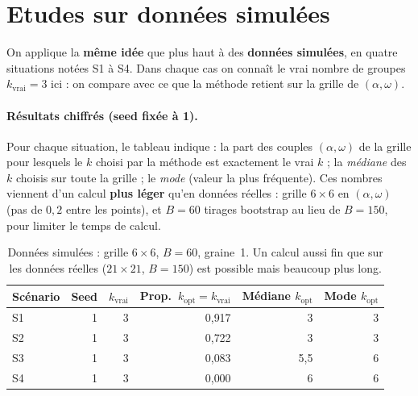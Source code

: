 \documentclass[11pt, a4paper]{article}
\begin{document}
\section{Etudes sur données simulées}

On applique la \textbf{même idée} que plus haut à des \textbf{données simulées},
en quatre situations notées S1 à S4. Dans chaque cas on connaît le vrai nombre de
groupes $k_{\mathrm{vrai}}=3$ ici : on compare avec ce que la méthode retient sur
la grille de $(\alpha,\omega)$.

\paragraph{Résultats chiffrés (seed fixée à 1).}
Pour chaque situation, le tableau indique : la part des couples
$(\alpha,\omega)$ de la grille pour lesquels le $k$ choisi par la méthode est
exactement le vrai $k$ ; la \emph{médiane} des $k$ choisis sur toute la grille ;
le \emph{mode} (valeur la plus fréquente). Ces nombres viennent d'un calcul
\textbf{plus léger} qu'en données réelles : grille $6\times6$ en $(\alpha,\omega)$
(pas de $0{,}2$ entre les points), et $B=60$ tirages bootstrap au lieu de
$B=150$, pour limiter le temps de calcul.

\begin{table}[H]
\centering
\small
\begin{tabular}{lrrrrr}
\toprule
\textbf{Scénario} & \textbf{Seed} & $k_{\mathrm{vrai}}$ &
\textbf{Prop.\ }$k_{\mathrm{opt}} = k_{\mathrm{vrai}}$ &
\textbf{Médiane} $k_{\mathrm{opt}}$ & \textbf{Mode} $k_{\mathrm{opt}}$ \\
\midrule
S1 & 1 & 3 & 0{,}917 & 3 & 3 \\
S2 & 1 & 3 & 0{,}722 & 3 & 3 \\
S3 & 1 & 3 & 0{,}083 & 5{,}5 & 6 \\
S4 & 1 & 3 & 0{,}000 & 6 & 6 \\
\bottomrule
\end{tabular}
\caption{Données simulées : grille $6\times6$, $B=60$, graine~1. Un calcul aussi fin
que sur les données réelles ($21\times21$, $B=150$) est possible mais beaucoup
plus long.}
\label{tab:sim-summary}
\end{table}
\end{document}
